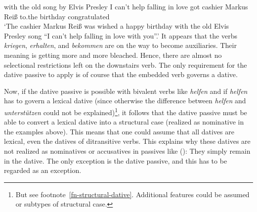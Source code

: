      with the old song   by  Elvis Presley \hphantom{"`}I can't help falling in love got cashier Markus Reiß to.the birthday congratulated\\
\glt `The cashier Markus Reiß was wished a happy birthday with the old Elvis Presley song ``I can't help falling in love with you''.'
\zl
It appears that the verbs \emph{kriegen}, \emph{erhalten}, and \emph{bekommen} are on the way to become
auxiliaries. Their meaning is getting more and more bleached. Hence, there are almost no selectional
restrictions left on the downstairs verb. The only requirement for the dative passive to apply is of
course that the embedded verb governs a dative.

Now, if the dative passive is possible with bivalent verbs like \emph{helfen} and if \emph{helfen}
has to govern a lexical dative (since otherwise the difference between \emph{helfen} and
\emph{unterstützen} could not be explained)\footnote{%
  But see footnote~\ref{fn-structural-dative}. Additional features could be assumed or subtypes of
  structural case.}, 
it follows that the dative passive must be able to
convert a lexical dative into a structural case (realized as nominative in the examples above). This
means that one could assume that all datives are lexical, even the datives of ditransitive
verbs. This explains why these datives are not realized as nominatives or accusatives in passives
like ():
\eal
{}
\zl
They simply remain in the dative. The only exception is the dative passive, and this has to be regarded as an exception.




